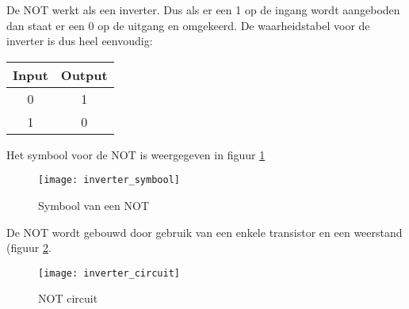 De NOT werkt als een inverter. Dus als er een 1 op de ingang wordt aangeboden dan staat er een 0 op de uitgang en omgekeerd. De waarheidstabel voor de inverter is dus heel eenvoudig:

\begin{tabular}{ |c|c| }
\hline
\rowcolor{gray!60}
Input & Output \\
\hline
0 & 1 \\
\hline
1 & 0 \\
\hline
\end{tabular}


Het symbool voor de NOT is weergegeven in figuur \ref{symbool:not}

\begin{figure}[h]
\texttt{[image: inverter\_symbool]}
\centering
\caption{Symbool van een NOT}
\label{symbool:not}
\end{figure}

De NOT wordt gebouwd door gebruik van een enkele transistor en een weerstand (figuur \ref{circuit:not}.

\begin{figure}[h]
\texttt{[image: inverter\_circuit]}
\centering
\caption{NOT circuit}
\label{circuit:not}
\end{figure}

